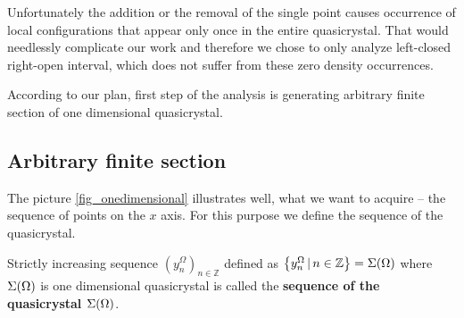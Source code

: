 \documentclass[text.tex]{subfiles}
\begin{document}
Unfortunately the addition or the removal of the single point causes occurrence of local configurations that appear only once in the entire quasicrystal. That would needlessly complicate our work and therefore we chose to only analyze left-closed right-open interval, which does not suffer from these zero density occurrences. 

According to our plan, first step of the analysis is generating arbitrary finite section of one dimensional quasicrystal. 

\subsection{Arbitrary finite section}
The picture \ref{fig_onedimensional} illustrates well, what we want to acquire -- the sequence of points on the $x$ axis. For this purpose we define the sequence of the quasicrystal. 

\begin{definition}
Strictly increasing sequence $(y_n^\Omega)_{n\in \mathbb{Z}}$ defined as $\left\{y_n^\Omega\,|\, n\in\mathbb{Z} \right\} = \Sigma(\Omega)$ where $\Sigma(\Omega)$ is one dimensional quasicrystal is called the \textbf{sequence of the quasicrystal $\Sigma(\Omega)$}.
\end{definition}
\end{document}

